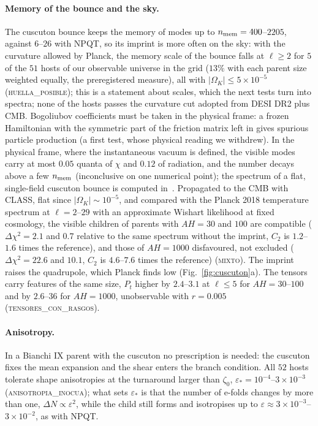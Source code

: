\documentclass[11pt,a4paper]{article}
\begin{document}
\paragraph{Memory of the bounce and the sky.}
The cuscuton bounce keeps the memory of modes up to $n_{\rm mem}=400$--$2205$, against $6$--$26$ with NPQT, so its imprint is more often on the sky: with the curvature allowed by Planck, the memory scale of the bounce falls at $\ell\ge2$ for $5$ of the $51$ hosts of our observable universe in the grid ($13\%$ with each parent size weighted equally, the preregistered measure), all with $|\Omega_K|\le5\times10^{-5}$ (\textsc{huella\_posible}); this is a statement about scales, which the next tests turn into spectra; none of the hosts passes the curvature cut adopted from DESI DR2 plus CMB.
Bogoliubov coefficients must be taken in the physical frame: a frozen Hamiltonian with the symmetric part of the friction matrix left in gives spurious particle production (a first test, whose physical reading we withdrew). In the physical frame, where the instantaneous vacuum is defined, the visible modes carry at most $0.05$ quanta of $\chi$ and $0.12$ of radiation, and the number decays above a few $n_{\rm mem}$ (inconclusive on one numerical point); the spectrum of a flat, single-field cuscuton bounce is computed in~\cite{KimGeshnizjani2020}.
Propagated to the CMB with CLASS, flat since $|\Omega_K|\sim10^{-5}$, and compared with the Planck 2018 temperature spectrum at $\ell=2$--$29$ with an approximate Wishart likelihood at fixed cosmology, the visible children of parents with $AH=30$ and $100$ are compatible ($\Delta\chi^2=2.1$ and $0.7$ relative to the same spectrum without the imprint, $C_2$ is $1.2$--$1.6$ times the reference), and those of $AH=1000$ disfavoured, not excluded ($\Delta\chi^2=22.6$ and $10.1$, $C_2$ is $4.6$--$7.6$ times the reference) (\textsc{mixto}). The imprint raises the quadrupole, which Planck finds low (Fig.~\ref{fig:cuscuton}a).
The tensors carry features of the same size, $P_t$ higher by $2.4$--$3.1$ at $\ell\le5$ for $AH=30$--$100$ and by $2.6$--$36$ for $AH=1000$, unobservable with $r=0.005$ (\textsc{tensores\_con\_rasgos}).

\paragraph{Anisotropy.}
In a Bianchi IX parent with the cuscuton no prescription is needed: the cuscuton fixes the mean expansion and the shear enters the branch condition.
All $52$ hosts tolerate shape anisotropies at the turnaround larger than $\zeta_0$, $\varepsilon_*=10^{-4}$--$3\times10^{-3}$ (\textsc{anisotropia\_inocua}); what sets $\varepsilon_*$ is that the number of e-folds changes by more than one, $\Delta N\propto\varepsilon^2$, while the child still forms and isotropises up to $\varepsilon\approx3\times10^{-3}$--$3\times10^{-2}$, as with NPQT.
\end{document}
